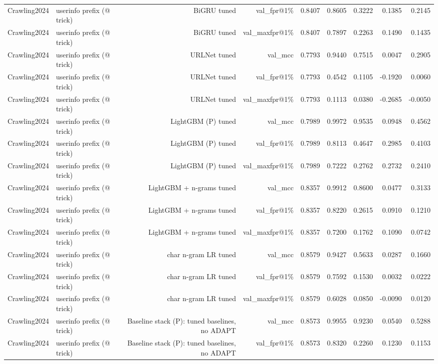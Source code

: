 \begin{table}[t]
\begin{tabular}{llrrrrrrr}
Crawling2024 & userinfo prefix (@ trick) & BiGRU tuned & val\_fpr@1\% & 0.8407 & 0.8605 & 0.3222 & 0.1385 & 0.2145 \\
Crawling2024 & userinfo prefix (@ trick) & BiGRU tuned & val\_maxfpr@1\% & 0.8407 & 0.7897 & 0.2263 & 0.1490 & 0.1435 \\
Crawling2024 & userinfo prefix (@ trick) & URLNet tuned & val\_mcc & 0.7793 & 0.9440 & 0.7515 & 0.0047 & 0.2905 \\
Crawling2024 & userinfo prefix (@ trick) & URLNet tuned & val\_fpr@1\% & 0.7793 & 0.4542 & 0.1105 & -0.1920 & 0.0060 \\
Crawling2024 & userinfo prefix (@ trick) & URLNet tuned & val\_maxfpr@1\% & 0.7793 & 0.1113 & 0.0380 & -0.2685 & -0.0050 \\
Crawling2024 & userinfo prefix (@ trick) & LightGBM (P) tuned & val\_mcc & 0.7989 & 0.9972 & 0.9535 & 0.0948 & 0.4562 \\
Crawling2024 & userinfo prefix (@ trick) & LightGBM (P) tuned & val\_fpr@1\% & 0.7989 & 0.8113 & 0.4647 & 0.2985 & 0.4103 \\
Crawling2024 & userinfo prefix (@ trick) & LightGBM (P) tuned & val\_maxfpr@1\% & 0.7989 & 0.7222 & 0.2762 & 0.2732 & 0.2410 \\
Crawling2024 & userinfo prefix (@ trick) & LightGBM + n-grams tuned & val\_mcc & 0.8357 & 0.9912 & 0.8600 & 0.0477 & 0.3133 \\
Crawling2024 & userinfo prefix (@ trick) & LightGBM + n-grams tuned & val\_fpr@1\% & 0.8357 & 0.8220 & 0.2615 & 0.0910 & 0.1210 \\
Crawling2024 & userinfo prefix (@ trick) & LightGBM + n-grams tuned & val\_maxfpr@1\% & 0.8357 & 0.7200 & 0.1762 & 0.1090 & 0.0742 \\
Crawling2024 & userinfo prefix (@ trick) & char n-gram LR tuned & val\_mcc & 0.8579 & 0.9427 & 0.5633 & 0.0287 & 0.1660 \\
Crawling2024 & userinfo prefix (@ trick) & char n-gram LR tuned & val\_fpr@1\% & 0.8579 & 0.7592 & 0.1530 & 0.0032 & 0.0222 \\
Crawling2024 & userinfo prefix (@ trick) & char n-gram LR tuned & val\_maxfpr@1\% & 0.8579 & 0.6028 & 0.0850 & -0.0090 & 0.0120 \\
Crawling2024 & userinfo prefix (@ trick) & Baseline stack (P): tuned baselines, no ADAPT & val\_mcc & 0.8573 & 0.9955 & 0.9230 & 0.0540 & 0.5288 \\
Crawling2024 & userinfo prefix (@ trick) & Baseline stack (P): tuned baselines, no ADAPT & val\_fpr@1\% & 0.8573 & 0.8320 & 0.2260 & 0.1230 & 0.1153 \\

\end{tabular}
\end{table}

